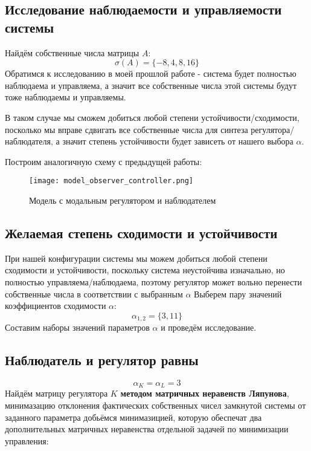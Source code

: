 \subsection{Исследование наблюдаемости и управляемости системы}
Найдём собственные числа матрицы $A$:
$$
    \sigma(A) = \{-8, 4, 8, 16\}
$$
Обратимся к исследованию в моей прошлой работе - система будет полностью наблюдаема и управляема, 
а значит все собственные числа этой системы будут тоже наблюдаемы и управляемы.

В таком случае мы сможем добиться любой степени устойчивости/сходимости, посколько мы вправе сдвигать все собственные числа для синтеза
регулятора/наблюдателя, а значит
степень устойчивости будет зависеть от нашего выбора $\alpha$. 

Построим аналогичную схему с предыдущей работы:

\begin{figure}[ht]
  \centering
  \texttt{[image: model\_observer\_controller.png]}
  \caption{Модель с модальным регулятором и наблюдателем}
\end{figure}

\newpage
\subsection{Желаемая степень сходимости и устойчивости}
При нашей конфигурации системы мы можем добиться любой степени сходимости и устойчивости, 
поскольку система неустойчива изначально, но полностью управляема/наблюдаема, 
поэтому регулятор может вольно перенести собственные числа в соответствии с выбранным $\alpha$
Выберем пару значений коэффициентов сходимости $\alpha$:
$$
  \alpha_{1,2} = \{ 3, 11 \} 
$$
Составим наборы значений параметров $\alpha$ и проведём исследование.
\subsection{Наблюдатель и регулятор равны}
$$
  \alpha_K = \alpha_L = 3
$$
Найдём матрицу регулятора $K$ \textbf{методом матричных неравенств Ляпунова}, минимазацию отклонения фактических собственных чисел замкнутой системы от заданного параметра добьёмся минимазицией, 
которую обеспечат два дополнительных матричных неравенства отдельной задачей по минимизации управления:

